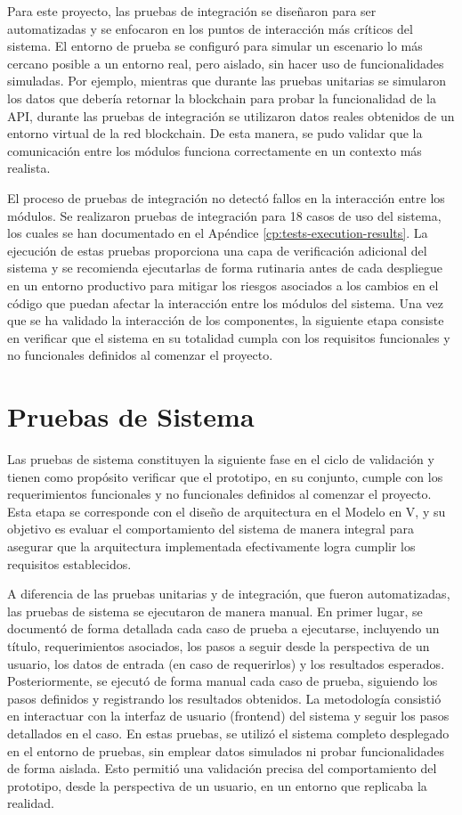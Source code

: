 Para este proyecto, las pruebas de integración se diseñaron para ser automatizadas y se enfocaron en los puntos de interacción más críticos del sistema. El entorno de prueba se configuró para simular un escenario lo más cercano posible a un entorno real, pero aislado, sin hacer uso de funcionalidades simuladas. Por ejemplo, mientras que durante las pruebas unitarias se simularon los datos que debería retornar la blockchain para probar la funcionalidad de la API, durante las pruebas de integración se utilizaron datos reales obtenidos de un entorno virtual de la red blockchain. De esta manera, se pudo validar que la comunicación entre los módulos funciona correctamente en un contexto más realista.

El proceso de pruebas de integración no detectó fallos en la interacción entre los módulos. Se realizaron pruebas de integración para 18 casos de uso del sistema, los cuales se han documentado en el Apéndice \ref{cp:tests-execution-results}. La ejecución de estas pruebas proporciona una capa de verificación adicional del sistema y se recomienda ejecutarlas de forma rutinaria antes de cada despliegue en un entorno productivo para mitigar los riesgos asociados a los cambios en el código que puedan afectar la interacción entre los módulos del sistema. Una vez que se ha validado la interacción de los componentes, la siguiente etapa consiste en verificar que el sistema en su totalidad cumpla con los requisitos funcionales y no funcionales definidos al comenzar el proyecto.

\section{Pruebas de Sistema}
\label{sec:system-testing}

Las pruebas de sistema constituyen la siguiente fase en el ciclo de validación y tienen como propósito verificar que el prototipo, en su conjunto, cumple con los requerimientos funcionales y no funcionales definidos al comenzar el proyecto. Esta etapa se corresponde con el diseño de arquitectura en el Modelo en V, y su objetivo es evaluar el comportamiento del sistema de manera integral para asegurar que la arquitectura implementada efectivamente logra cumplir los requisitos establecidos.

A diferencia de las pruebas unitarias y de integración, que fueron automatizadas, las pruebas de sistema se ejecutaron de manera manual. En primer lugar, se documentó de forma detallada cada caso de prueba a ejecutarse, incluyendo un título, requerimientos asociados, los pasos a seguir desde la perspectiva de un usuario, los datos de entrada (en caso de requerirlos) y los resultados esperados. Posteriormente, se ejecutó de forma manual cada caso de prueba, siguiendo los pasos definidos y registrando los resultados obtenidos. La metodología consistió en interactuar con la interfaz de usuario (frontend) del sistema y seguir los pasos detallados en el caso. En estas pruebas, se utilizó el sistema completo desplegado en el entorno de pruebas, sin emplear datos simulados ni probar funcionalidades de forma aislada. Esto permitió una validación precisa del comportamiento del prototipo, desde la perspectiva de un usuario, en un entorno que replicaba la realidad.

